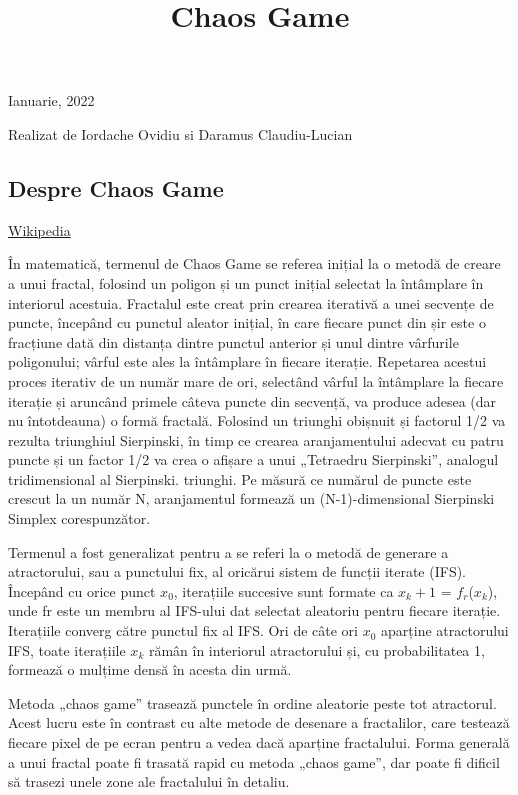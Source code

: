 \documentclass[
]{article}
\title{Chaos Game}
\author{}
\date{\vspace{-2.5em}}
\begin{document}
\maketitle

Ianuarie, 2022

Realizat de Iordache Ovidiu si Daramus Claudiu-Lucian

\hypertarget{despre-chaos-game}{%
\subsection{Despre Chaos Game}\label{despre-chaos-game}}

\href{https://en.wikipedia.org/wiki/Chaos_game}{Wikipedia}

În matematică, termenul de Chaos Game se referea inițial la o metodă de
creare a unui fractal, folosind un poligon și un punct inițial selectat
la întâmplare în interiorul acestuia. Fractalul este creat prin crearea
iterativă a unei secvențe de puncte, începând cu punctul aleator
inițial, în care fiecare punct din șir este o fracțiune dată din
distanța dintre punctul anterior și unul dintre vârfurile poligonului;
vârful este ales la întâmplare în fiecare iterație. Repetarea acestui
proces iterativ de un număr mare de ori, selectând vârful la întâmplare
la fiecare iterație și aruncând primele câteva puncte din secvență, va
produce adesea (dar nu întotdeauna) o formă fractală. Folosind un
triunghi obișnuit și factorul 1/2 va rezulta triunghiul Sierpinski, în
timp ce crearea aranjamentului adecvat cu patru puncte și un factor 1/2
va crea o afișare a unui „Tetraedru Sierpinski'', analogul
tridimensional al Sierpinski. triunghi. Pe măsură ce numărul de puncte
este crescut la un număr N, aranjamentul formează un (N-1)-dimensional
Sierpinski Simplex corespunzător.

Termenul a fost generalizat pentru a se referi la o metodă de generare a
atractorului, sau a punctului fix, al oricărui sistem de funcții iterate
(IFS). Începând cu orice punct \(x_0\), iterațiile succesive sunt
formate ca \(x_k+1\) = \(f_r\)(\(x_k\)), unde fr este un membru al
IFS-ului dat selectat aleatoriu pentru fiecare iterație. Iterațiile
converg către punctul fix al IFS. Ori de câte ori \(x_0\) aparține
atractorului IFS, toate iterațiile \(x_k\) rămân în interiorul
atractorului și, cu probabilitatea 1, formează o mulțime densă în acesta
din urmă.

Metoda „chaos game'' trasează punctele în ordine aleatorie peste tot
atractorul. Acest lucru este în contrast cu alte metode de desenare a
fractalilor, care testează fiecare pixel de pe ecran pentru a vedea dacă
aparține fractalului. Forma generală a unui fractal poate fi trasată
rapid cu metoda „chaos game'', dar poate fi dificil să trasezi unele
zone ale fractalului în detaliu.
\end{document}
